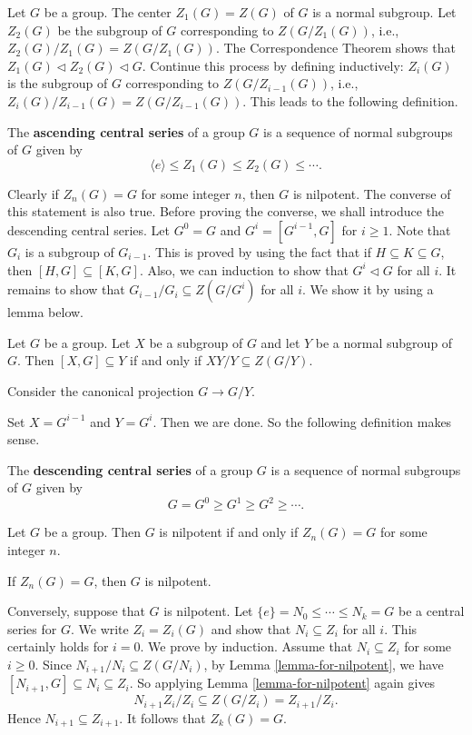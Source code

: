 Let $ G $ be a group. The center $Z_1(G) =  Z(G) $ of $ G $ is a normal subgroup. Let $ Z_{2}(G) $ be the subgroup of $G$ corresponding to $ Z(G/Z_1(G)) $, i.e., $
	Z_2(G) / Z_1(G) = Z(G/Z_1(G))$. The Correspondence Theorem shows that $Z_1(G) \lhd Z_2(G) \lhd G$.  Continue this process by defining inductively:  $Z_{i}(G)$ is the subgroup of $G$ corresponding to $ Z(G/Z_{i-1}(G)) $, i.e., $Z_i(G) / Z_{i-1}(G) = Z(G/Z_{i-1}(G))$. This leads to the following definition.

\begin{definition}
 	The \textbf{ascending central series} of a group $G$ is a sequence of normal subgroups of $G$ given by  $$ \langle e \rangle \leq Z_{1}(G) \leq  Z_{2}(G) \leq  \cdots .$$
\end{definition} 
 Clearly if $Z_n (G) = G$ for some integer $n$, then $G$ is nilpotent. The converse of this statement is also true. Before proving the converse, we shall introduce the descending central series. Let $G^0 = G$ and $G^i = [G^{i-1},G]$ for $i\geq 1$. Note that $G_i$ is a subgroup of $G_{i-1}$. This is proved by using the fact that if $H\subseteq K \subseteq G$, then $[H,G]\subseteq [K,G]$. Also, we can induction to show that $G^i\lhd G$  for all $i$. It remains to show that $G_{i-1}/G_i\subseteq Z(G/G^i)$  for all $i$. We show it by using a lemma below.
 \begin{lemma} \label{lemma-for-nilpotent}
 	Let $G$ be a group. Let $X$ be a subgroup of $G$ and let $Y$ be a normal subgroup of $G$. Then $[X,G]\subseteq Y$ if and only if $XY/Y\subseteq Z(G/Y)$.
 \end{lemma}
 \begin{sketch}
 	Consider the canonical projection $G\rightarrow G/Y$.
 \end{sketch}
 Set $X = G^{i-1}$ and $Y = G^i$. Then we are done. So the following definition makes sense.
 \begin{definition}
 	The \textbf{descending central series} of a group $G$ is a sequence of normal subgroups of $G$ given by  $$ G = G^0  \geq G^1 \geq  G^2 \geq  \cdots .$$
 \end{definition}
 
 \begin{theorem} \label{thm-nilpotent}
 	 Let $G$ be a group. Then $G$ is nilpotent if and only if  $Z_n(G) = G$ for some integer $n$.
 \end{theorem}
 \begin{sketch}
  	If $Z_n(G) = G$, then $G$ is nilpotent.
  	
  	Conversely,  suppose that $G$ is nilpotent.  Let $\{e\} = N_0 \leq \cdots \leq N_k = G$ be a central series for $G$. We write $Z_i = Z_i(G)$ and show that $N_i \subseteq Z_i$ for all $i$. This certainly holds for $i = 0$. We prove by induction.  Assume that $N_{i} \subseteq Z_{i}$ for some $i\geq 0$. Since $N_{i+1}/N_i \subseteq Z(G/N_i)$, by Lemma \ref{lemma-for-nilpotent}, we have $[N_{i+1}, G] \subseteq N_{i} \subseteq Z_{i}$. So applying Lemma \ref{lemma-for-nilpotent} again gives
 	\[ N_{i+1} Z_{i}/Z_{i} \subseteq Z(G/Z_{i}) = Z_{i+1}/Z_{i}.\]
 	Hence $N_{i+1} \subseteq Z_{i+1}$.   It follows that $Z_k(G) = G$.
 \end{sketch}
 
